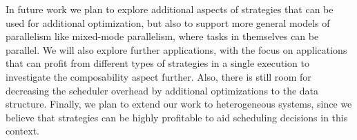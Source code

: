 \documentclass[a4paper,11pt]{article}
\begin{document}
In future work we plan to explore additional aspects of strategies
that can be used for additional optimization, but also to support more
general models of parallelism like mixed-mode parallelism, where tasks
in themselves can be parallel.  We will also explore further
applications, with the focus on applications that can profit from
different types of strategies in a single execution to investigate the
composability aspect further. Also, there is still room for decreasing
the scheduler overhead by additional optimizations to the
data structure. Finally, we plan to extend our work to heterogeneous
systems, since we believe that strategies can be highly profitable to
aid scheduling decisions in this context.



\end{document}
